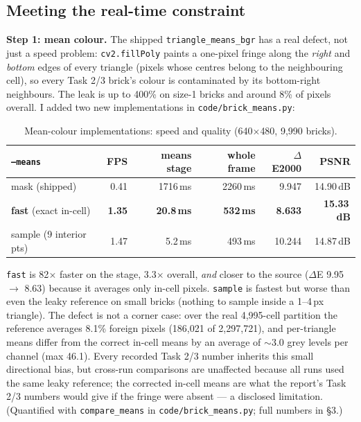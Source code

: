\documentclass[11pt,a4paper]{article}
\begin{document}
\FloatBarrier
\FloatBarrier
\subsection{Meeting the real-time constraint}
\label{sec:t4-optimise}

\textbf{Step 1: mean colour.} The shipped \texttt{triangle\_means\_bgr} has a
real defect, not just a speed problem: \texttt{cv2.fillPoly} paints a one-pixel
fringe along the \emph{right} and \emph{bottom} edges of every triangle (pixels
whose centres belong to the neighbouring cell), so every Task 2/3 brick's colour
is contaminated by its bottom-right neighbours. The leak is up to 400\% on
size-1 bricks and around 8\% of pixels overall. I added two new implementations
in \texttt{code/brick\_means.py}:

\begin{table}[htbp]
\centering
\begin{tabular}{@{}l r r r r r@{}}
\toprule
\textbf{\texttt{--means}} & \textbf{FPS} & \textbf{means stage} & \textbf{whole frame} & \textbf{$\Delta$E2000} & \textbf{PSNR}\\
\midrule
mask (shipped)                & 0.41 & 1716\,ms & 2260\,ms & 9.947 & 14.90\,dB \\
\textbf{fast} (exact in-cell) & \textbf{1.35} & \textbf{20.8\,ms} & \textbf{532\,ms} & \textbf{8.633} & \textbf{15.33\,dB} \\
sample (9 interior pts)       & 1.47 & 5.2\,ms & 493\,ms & 10.244 & 14.87\,dB \\
\bottomrule
\end{tabular}
\caption{Mean-colour implementations: speed and quality
(640$\times$480, 9{,}990 bricks).}
\label{tab:means}
\end{table}

\texttt{fast} is 82$\times$ faster on the stage, 3.3$\times$ overall,
\emph{and} closer to the source ($\Delta$E 9.95 $\rightarrow$ 8.63) because it
averages only in-cell pixels. \texttt{sample} is fastest but worse than even the
leaky reference on small bricks (nothing to sample inside a 1--4\,px triangle).
The defect is not a corner case: over the real 4{,}995-cell partition the
reference averages 8.1\% foreign pixels (186{,}021 of 2{,}297{,}721), and
per-triangle means differ from the correct in-cell means by an average of $\sim$3.0
grey levels per channel (max 46.1). Every recorded Task 2/3 number inherits this
small directional bias, but cross-run comparisons are unaffected because all
runs used the same leaky reference; the corrected in-cell means are what the
report's Task 2/3 numbers would give if the fringe were absent --- a disclosed
limitation. (Quantified with \texttt{compare\_means} in
\texttt{code/brick\_means.py}; full numbers in
 \S3.)
\end{document}
